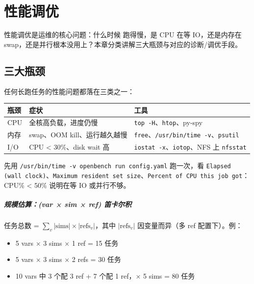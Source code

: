 
\chapter{性能调优}

性能调优是运维的核心问题：什么时候 \openbench{} 跑得慢，是 CPU 在等 IO，还是内存在 swap，还是并行根本没用上？本章分类讲解三大瓶颈与对应的诊断/调优手段。

\section{三大瓶颈}

任何长跑任务的性能问题都落在三类之一：

\begin{longtable}{p{2cm} p{4.5cm} p{6cm}}
  \toprule
  瓶颈 & 症状 & 工具 \\
  \midrule
  \endhead
  CPU & 全核高负载，进度仍慢 & \texttt{top -H}、\texttt{htop}、py-spy \\
  内存 & swap、OOM kill、运行越久越慢 & \texttt{free}、\texttt{/usr/bin/time -v}、\texttt{psutil} \\
  I/O & CPU < 30\%、disk wait 高 & \texttt{iostat -x}、\texttt{iotop}、NFS 上 \texttt{nfsstat} \\
  \bottomrule
\end{longtable}

先用 \texttt{/usr/bin/time -v openbench run config.yaml} 跑一次，看 \texttt{Elapsed (wall clock)}、\texttt{Maximum resident set size}、\texttt{Percent of CPU this job got}：CPU\% < 50\% 说明在等 IO 或并行不够。

\paragraph{规模估算：(var × sim × ref) 笛卡尔积}

\openbench{} 任务总数 = $\sum_v |\text{sims}| \times |\text{refs}_v|$，其中 $|\text{refs}_v|$ 因变量而异（多 ref 配置下）。例：

\begin{itemize}
  \item 5 vars × 3 sims × 1 ref = 15 任务
  \item 5 vars × 3 sims × 2 refs = 30 任务
  \item 10 vars 中 3 个配 3 ref + 7 个配 1 ref，× 5 sims = 80 任务
\end{itemize}

